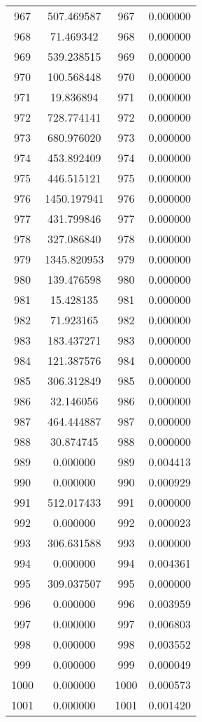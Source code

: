 \documentclass[12pt]{article}
\begin{document}
\begin{longtable}{@{}cccc@{}}
967 & 507.469587 & 967 & 0.000000 \\
968 & 71.469342 & 968 & 0.000000 \\
969 & 539.238515 & 969 & 0.000000 \\
970 & 100.568448 & 970 & 0.000000 \\
971 & 19.836894 & 971 & 0.000000 \\
972 & 728.774141 & 972 & 0.000000 \\
973 & 680.976020 & 973 & 0.000000 \\
974 & 453.892409 & 974 & 0.000000 \\
975 & 446.515121 & 975 & 0.000000 \\
976 & 1450.197941 & 976 & 0.000000 \\
977 & 431.799846 & 977 & 0.000000 \\
978 & 327.086840 & 978 & 0.000000 \\
979 & 1345.820953 & 979 & 0.000000 \\
980 & 139.476598 & 980 & 0.000000 \\
981 & 15.428135 & 981 & 0.000000 \\
982 & 71.923165 & 982 & 0.000000 \\
983 & 183.437271 & 983 & 0.000000 \\
984 & 121.387576 & 984 & 0.000000 \\
985 & 306.312849 & 985 & 0.000000 \\
986 & 32.146056 & 986 & 0.000000 \\
987 & 464.444887 & 987 & 0.000000 \\
988 & 30.874745 & 988 & 0.000000 \\
989 & 0.000000 & 989 & 0.004413 \\
990 & 0.000000 & 990 & 0.000929 \\
991 & 512.017433 & 991 & 0.000000 \\
992 & 0.000000 & 992 & 0.000023 \\
993 & 306.631588 & 993 & 0.000000 \\
994 & 0.000000 & 994 & 0.004361 \\
995 & 309.037507 & 995 & 0.000000 \\
996 & 0.000000 & 996 & 0.003959 \\
997 & 0.000000 & 997 & 0.006803 \\
998 & 0.000000 & 998 & 0.003552 \\
999 & 0.000000 & 999 & 0.000049 \\
1000 & 0.000000 & 1000 & 0.000573 \\
1001 & 0.000000 & 1001 & 0.001420 \\

\end{longtable}
\end{document}
